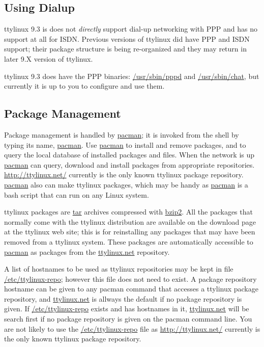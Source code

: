 \documentclass[10pt]{article}
\begin{document}
\subsection{Using Dialup}

ttylinux 9.3 is does not {\it directly} support dial-up networking with PPP and
has no support at all for ISDN. Previous versions of ttylinux did have PPP and
ISDN support; their package structure is being re-organized and they may return
in later 9.X version of ttylinux.

ttylinux 9.3 does have the PPP binaries: \url{/usr/sbin/pppd} and
\url{/usr/sbin/chat}, but currently it is up to you to configure and use them.

\subsection{Package Management}
\label{pacmanger}

Package management is handled by \url{pacman}; it is invoked from the shell
by typing its name, \url{pacman}. Use \url{pacman} to install and remove
packages, and to query the local database of installed packages and files. When
the network is up \url{pacman} can query, download and install packages from
appropriate repositories. \url{http://ttylinux.net/} currently is the only
known ttylinux package repository. \url{pacman} also can make ttylinux
packages, which may be handy as \url{pacman} is a bash script that can run on
any Linux system.

ttylinux packages are \url{tar} archives compressed with \url{bzip2}. All the
packages that normally come with the ttylinux distribution are available on the
download page at the ttylinux web site; this is for reinstalling any packages
that may have been removed from a ttylinux system. These packages are
automatically accessible to \url{pacman} as packages from the
\url{ttylinux.net} repository.

A list of hostnames to be used as ttylinux repositories may be kept in file
\url{/etc/ttylinux-repo}; however this file does not need to exist. A package
repository hostname can be given to any pacman command that accesses a ttylinux
package repository, and \url{ttylinux.net} is allways the default if no package
repository is given. If \url{/etc/ttylinux-repo} exists and has hostnames in
it, \url{ttylinux.net} will be search first if no package repository is given
on the pacman command line. You are not likely to use the
\url{/etc/ttylinux-repo} file as \url{http://ttylinux.net/} currently is the
only known ttylinux package repository.
\end{document}
